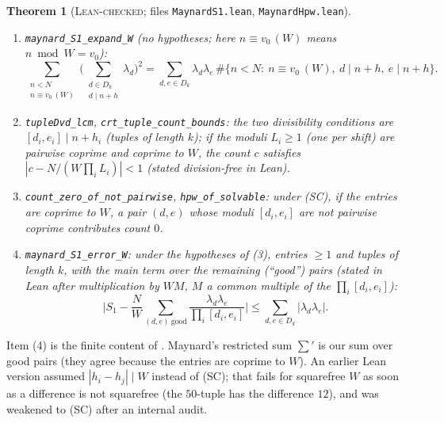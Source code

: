 \documentclass[11pt]{amsart}
\newtheorem{theorem}{Theorem}
\theoremstyle{definition}
\theoremstyle{remark}
\newcommand{\lbl}[1]{\textup{\textsc{#1}}}
\newcommand{\tl}[1]{\texttt{#1}}
\begin{document}
\begin{theorem}[\lbl{Lean-checked}; files \tl{MaynardS1.lean}, \tl{MaynardHpw.lean}]\label{thm:s1}
\begin{enumerate}
\item \tl{maynard\_S1\_expand\_W} (no hypotheses; here $n\equiv v_0\,(W)$ means $n\bmod W=v_0$):
\[
\sum_{\substack{n<N\\ n\equiv v_0\,(W)}}\Big(\sum_{\substack{d\in D_k\\ d\mid n+h}}\lambda_d\Big)^2
=\sum_{d,e\in D_k}\lambda_d\lambda_e\,\#\{n<N:\ n\equiv v_0\ (W),\ d\mid n+h,\ e\mid n+h\}.
\]
\item \tl{tupleDvd\_lcm}, \tl{crt\_tuple\_count\_bounds}: the two divisibility
conditions are $[d_i,e_i]\mid n+h_i$ (tuples of length $k$); if the moduli
$L_i\ge1$ (one per shift) are pairwise coprime and coprime to $W$, the count $c$
satisfies $|c-N/(W\prod_iL_i)|<1$ (stated division-free in Lean).
\item \tl{count\_zero\_of\_not\_pairwise}, \tl{hpw\_of\_solvable}: under (SC),
if the entries are coprime to $W$, a pair $(d,e)$
whose moduli $[d_i,e_i]$ are not pairwise coprime contributes count $0$.
\item \tl{maynard\_S1\_error\_W}: under the hypotheses of (3), entries $\ge1$ and
tuples of length $k$, with the main term over the remaining (``good'') pairs
(stated in Lean after multiplication by $WM$, $M$ a common multiple of the
$\prod_i[d_i,e_i]$):
\[
\Big|S_1-\frac NW\sum_{(d,e)\ \mathrm{good}}\frac{\lambda_d\lambda_e}{\prod_i[d_i,e_i]}\Big|
\le\sum_{d,e\in D_k}|\lambda_d\lambda_e|.
\]
\end{enumerate}
\end{theorem}

\noindent Item (4) is the finite content of \cite[(5.2)]{May15}. Maynard's
restricted sum $\sum'$ is our sum over good pairs (they agree because the
entries are coprime to $W$). An earlier Lean version assumed $|h_i-h_j|\mid W$
instead of (SC); that fails for squarefree $W$ as soon as a difference is not
squarefree (the $50$-tuple has the difference $12$), and was weakened to (SC)
after an internal audit.
\end{document}
